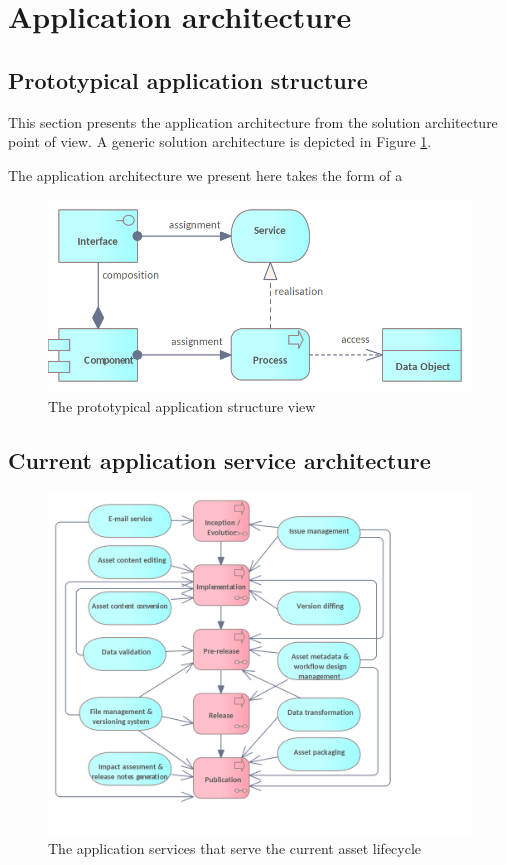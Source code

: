 \section{Application architecture}
\label{sec:application-architecture}

	\subsection{Prototypical application structure}
	
	This section presents the application architecture from the solution architecture point of view. A generic solution architecture is depicted in Figure \ref{fig:application-view}.
	
	The application architecture we present here takes the form of a 
	
    \begin{figure}[h]
		\centering
		\includegraphics[width=.9\textwidth]{docs/architecture/images/views/Application view.png}
		\caption{The prototypical application structure view}
		\label{fig:application-view}
	\end{figure}
	
	\subsection{Current application service architecture}
	\label{sec:application-current}
	
	\begin{figure}[h]
		\centering
		\includegraphics[width=.9\textwidth]{images/application/Application Services (current).png}
		\caption{The application services that serve the current asset lifecycle}
		\label{fig:application-current}
	\end{figure}
	
